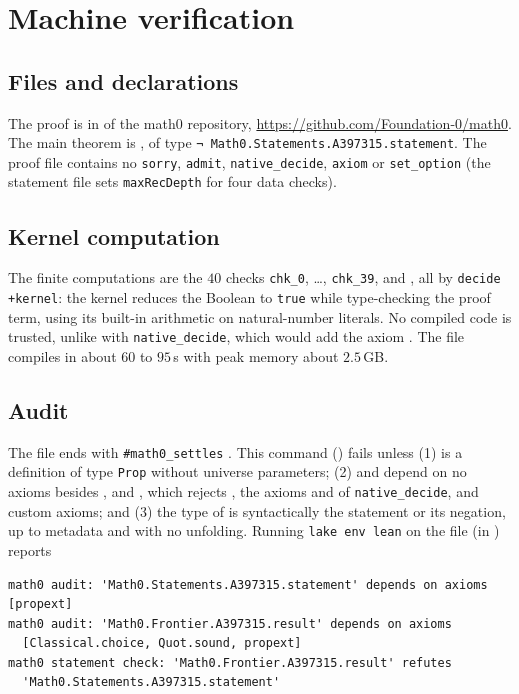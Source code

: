 \documentclass[11pt]{amsart}
\theoremstyle{plain}
\theoremstyle{definition}
\begin{document}
\section{Machine verification}\label{sec:lean}

\subsection*{Files and declarations}
The proof is in  of the math0 repository, \url{https://github.com/Foundation-0/math0}. The main theorem is , of type \texttt{¬ Math0.Statements.A397315.statement}. The proof file contains no \texttt{sorry}, \texttt{admit}, \texttt{native\_decide}, \texttt{axiom} or \texttt{set\_option} (the statement file sets \texttt{maxRecDepth} for four data checks).

\subsection*{Kernel computation}
The finite computations are the $40$ checks \texttt{chk\_0}, \dots, \texttt{chk\_39},  and , all by \texttt{decide +kernel}: the kernel reduces the Boolean to \texttt{true} while type-checking the proof term, using its built-in arithmetic on natural-number literals. No compiled code is trusted, unlike with \texttt{native\_decide}, which would add the axiom . The file compiles in about $60$ to $95$\,s with peak memory about $2.5$\,GB.

\subsection*{Audit}
The file ends with \texttt{\#math0\_settles}  . This command () fails unless (1)  is a definition of type \texttt{Prop} without universe parameters; (2)  and  depend on no axioms besides ,  and , which rejects , the axioms  and  of \texttt{native\_decide}, and custom axioms; and (3) the type of  is syntactically the statement or its negation, up to metadata and with no unfolding. Running \texttt{lake env lean} on the file (in ) reports
\begin{lstlisting}
math0 audit: 'Math0.Statements.A397315.statement' depends on axioms [propext]
math0 audit: 'Math0.Frontier.A397315.result' depends on axioms
  [Classical.choice, Quot.sound, propext]
math0 statement check: 'Math0.Frontier.A397315.result' refutes
  'Math0.Statements.A397315.statement'
\end{lstlisting}
\end{document}
